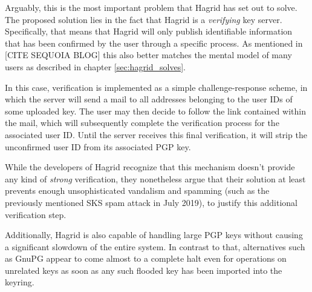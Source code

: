 Arguably, this is the most important problem that Hagrid has set out to solve. The proposed solution lies in the fact that Hagrid is a \emph{verifying} key server. Specifically, that means that Hagrid will only publish identifiable information that has been confirmed by the user through a specific process. As mentioned in [CITE SEQUOIA BLOG] this also better matches the mental model of many users as described in chapter \ref{sec:hagrid_solves}.

In this case, verification is implemented as a simple challenge-response scheme, in which the server will send a mail to all addresses belonging to the user IDs of some uploaded key. The user may then decide to follow the link contained within the mail, which will subsequently complete the verification process for the associated user ID.
Until the server receives this final verification, it will strip the unconfirmed user ID from its associated PGP key.

While the developers of Hagrid recognize that this mechanism doesn't provide any kind of \emph{strong} verification, they nonetheless argue that their solution at least prevents enough unsophisticated vandalism and spamming (such as the previously mentioned SKS spam attack in July 2019), to justify this additional verification step.

Additionally, Hagrid is also capable of handling large PGP keys without causing a significant slowdown of the entire system. In contrast to that, alternatives such  as GnuPG appear to come almost to a complete halt even for operations on unrelated keys as soon as any such flooded key has been imported into the keyring. 
